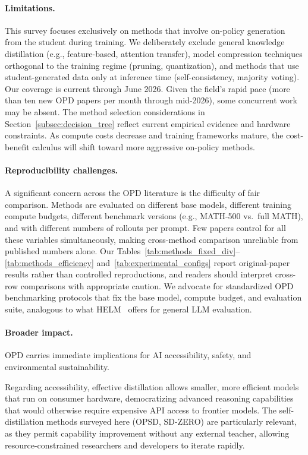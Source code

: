 \documentclass{article} %
\begin{document}
\paragraph{Limitations.} This survey focuses exclusively on methods that involve on-policy generation from the student during training. We deliberately exclude general knowledge distillation (e.g., feature-based, attention transfer), model compression techniques orthogonal to the training regime (pruning, quantization), and methods that use student-generated data only at inference time (self-consistency, majority voting). Our coverage is current through June 2026. Given the field's rapid pace (more than ten new OPD papers per month through mid-2026), some concurrent work may be absent. The method selection considerations in Section~\ref{subsec:decision_tree} reflect current empirical evidence and hardware constraints. As compute costs decrease and training frameworks mature, the cost-benefit calculus will shift toward more aggressive on-policy methods.

\paragraph{Reproducibility challenges.} A significant concern across the OPD literature is the difficulty of fair comparison. Methods are evaluated on different base models, different training compute budgets, different benchmark versions (e.g., MATH-500 vs.~full MATH), and with different numbers of rollouts per prompt. Few papers control for all these variables simultaneously, making cross-method comparison unreliable from published numbers alone. Our Tables~\ref{tab:methods_fixed_div}--\ref{tab:methods_efficiency} and~\ref{tab:experimental_configs} report original-paper results rather than controlled reproductions, and readers should interpret cross-row comparisons with appropriate caution. We advocate for standardized OPD benchmarking protocols that fix the base model, compute budget, and evaluation suite, analogous to what HELM~\citep{2211.09110} offers for general LLM evaluation.

\paragraph{Broader impact.} OPD carries immediate implications for AI accessibility, safety, and environmental sustainability.

Regarding accessibility, effective distillation allows smaller, more efficient models that run on consumer hardware, democratizing advanced reasoning capabilities that would otherwise require expensive API access to frontier models. The self-distillation methods surveyed here (OPSD, SD-ZERO) are particularly relevant, as they permit capability improvement without any external teacher, allowing resource-constrained researchers and developers to iterate rapidly.
\end{document}
